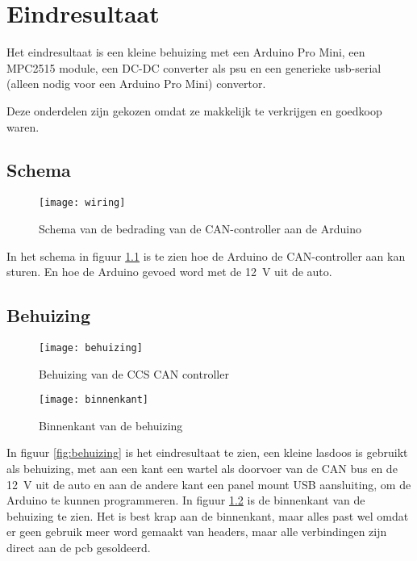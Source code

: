 \chapter{Eindresultaat}
\label{Eindresultaat}

Het eindresultaat is een kleine behuizing met een Arduino Pro Mini, een MPC2515
module, een DC-DC converter als \ac{psu} en een generieke \ac{usb}-serial
(alleen nodig voor een Arduino Pro Mini) convertor.

Deze onderdelen zijn gekozen omdat ze makkelijk te verkrijgen en goedkoop
waren.

\section{Schema}

\begin{figure}[]
    \centering
    \texttt{[image: wiring]}
    \caption{Schema van de bedrading van de CAN-controller aan de Arduino \cite{autowp}}
    \label{fig:wiring}
\end{figure}

In het schema in figuur \ref{fig:wiring} is te zien hoe de Arduino de
CAN-controller aan kan sturen. En hoe de Arduino gevoed word met de
\si{12\volt} uit de auto.

\section{Behuizing}

\begin{figure}[]
    \centering
    \begin{minipage}{0.45\textwidth}
        \centerline{\texttt{[image: behuizing]}}
        \caption{Behuizing van de CCS CAN controller}
        \label{fig:behuizing}
    \end{minipage}\hfill
    \begin{minipage}{0.45\textwidth}
        \centerline{\texttt{[image: binnenkant]}}
        \caption{Binnenkant van de behuizing}
        \label{fig:binnenkant}
    \end{minipage}
\end{figure}

In figuur \ref{fig:behuizing} is het eindresultaat te zien, een kleine lasdoos
is gebruikt als behuizing, met aan een kant een wartel als doorvoer van de CAN
bus en de \si{12\volt} uit de auto en aan de andere kant een panel mount USB
aansluiting, om de Arduino te kunnen programmeren. In figuur
\ref{fig:binnenkant} is de binnenkant van de behuizing te zien. Het is best
krap aan de binnenkant, maar alles past wel omdat er geen gebruik meer word
gemaakt van headers, maar alle verbindingen zijn direct aan de pcb gesoldeerd.